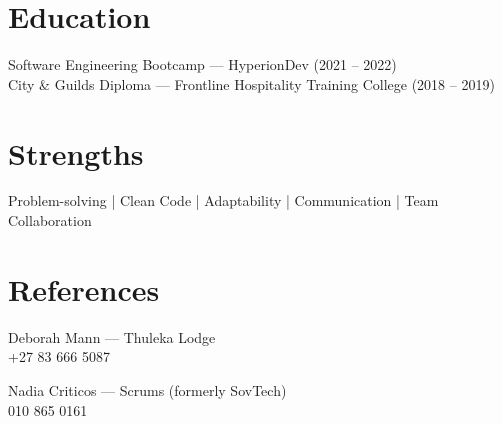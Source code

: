 \documentclass[10pt]{article}
\begin{document}
\section{Education}

Software Engineering Bootcamp --- HyperionDev (2021 -- 2022) \\
City \& Guilds Diploma --- Frontline Hospitality Training College (2018 -- 2019)

\section{Strengths}
Problem-solving \;|\; Clean Code \;|\; Adaptability \;|\; Communication \;|\; Team Collaboration

\section{References}

Deborah Mann --- Thuleka Lodge \\
+27 83 666 5087

\vspace{4pt}

Nadia Criticos --- Scrums (formerly SovTech) \\
010 865 0161
\end{document}
